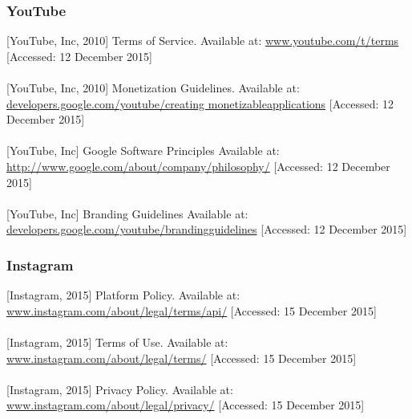 \subsubsection{YouTube}
{[YouTube, Inc, 2010]} Terms of Service. \newline
Available at: \href{https://www.youtube.com/t/terms}
   {www.youtube.com/t/terms} \newline
{[Accessed: 12 December 2015]} \\ \\
{[YouTube, Inc, 2010]} Monetization Guidelines. \newline
Available at: \href{
https://developers.google.com/youtube/creating_monetizable_applications}
   {developers.google.com/youtube/creating\textunderscore
   monetizable\textunderscore applications} \newline
{[Accessed: 12 December 2015]} \\ \\
{[YouTube, Inc]} Google Software Principles \newline
Available at: \href{http://www.google.com/about/company/philosophy/}
   {http://www.google.com/about/company/philosophy/} \newline
{[Accessed: 12 December 2015]} \\ \\
{[YouTube, Inc]} Branding Guidelines \newline
Available at: \href{https://developers.google.com/youtube/branding_guidelines}
  {developers.google.com/youtube/branding\textunderscore guidelines} \newline
{[Accessed: 12 December 2015]}

\subsubsection{Instagram}
{[Instagram, 2015]} Platform Policy. \newline
Available at: \href{https://www.instagram.com/about/legal/terms/api/}
   {www.instagram.com/about/legal/terms/api/} \newline
{[Accessed: 15 December 2015]} \\ \\
{[Instagram, 2015]} Terms of Use. \newline
Available at: \href{https://www.instagram.com/about/legal/terms/}
   {www.instagram.com/about/legal/terms/} \newline
{[Accessed: 15 December 2015]} \\ \\
{[Instagram, 2015]} Privacy Policy. \newline
Available at: \href{https://www.instagram.com/about/legal/privacy/}
   {www.instagram.com/about/legal/privacy/} \newline
{[Accessed: 15 December 2015]}